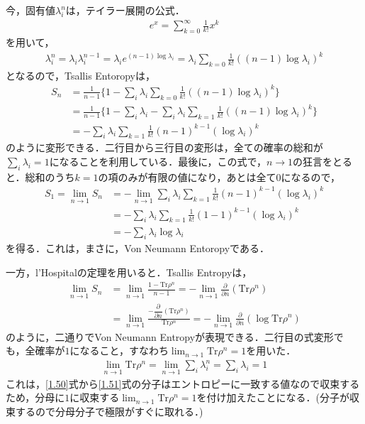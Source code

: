 今，固有値$\lambda_{i}^{n}$は，テイラー展開の公式．
\begin{align}
  e^{x}=\sum_{k=0}^{\infty}\frac{1}{k!}x^{k}
\end{align}
を用いて，
\begin{align}
  \lambda_{i}^{n}=\lambda_{i}\lambda_{i}^{n-1}=\lambda_{i}e^{(n-1)\log \lambda_{i}}=\lambda_{i}\sum_{k=0}\frac{1}{k!}((n-1)\log \lambda_{i})^{k}
\end{align}
となるので，Tsallis Entoropyは，
\begin{align}
S_{n}&=\frac{1}{n-1}\biggl\{1-\sum_{i}\lambda_{i}\sum_{k=0}\frac{1}{k!}((n-1)\log \lambda_{i})^{k}\biggr\}\\
&=\frac{1}{n-1}\biggl\{1-\sum_{i}\lambda_{i}-\sum_{i}\lambda_{i}\sum_{k=1}\frac{1}{k!}((n-1)\log \lambda_{i})^{k}\biggr\}\\
&=-\sum_{i}\lambda_{i}\sum_{k=1}\frac{1}{k!}(n-1)^{k-1}(\log \lambda_{i})^{k}
\end{align}
のように変形できる．二行目から三行目の変形は，全ての確率の総和が$\sum_{i}\lambda_{i}=1$になることを利用している．最後に，この式で，$n \to 1$の狂言をとると．総和のうち$k=1$の項のみが有限の値になり，あとは全て0になるので，
\begin{align}
  S_{1}=\lim_{n \to 1}S_{n}&=-\lim_{n \to 1}\sum_{i}\lambda_{i}\sum_{k=1}\frac{1}{k!}(n-1)^{k-1}(\log \lambda_{i})^{k}\\
  &=-\sum_{i}\lambda_{i}\sum_{k=1}\frac{1}{k!}(1-1)^{k-1}(\log \lambda_{i})^{k}\\
  &=-\sum_{i}\lambda_{i}\log \lambda_{i}
\end{align}
を得る．これは，まさに，Von Neumann Entoropyである．

一方，l'Hospitalの定理を用いると．Tsallis Entropyは，
\begin{align}
  \label{1.50}
  \lim_{n \to 1}S_{n}&=\lim_{n \to 1}\frac{1-\mathrm{Tr}\rho^n}{n-1}
  =-\lim_{n \to 1}\frac{\partial}{\partial n}(\mathrm{Tr}\rho^n)\\
  &=\lim_{n \to 1}\frac{-\dfrac{\partial}{\partial n}(\mathrm{Tr}\rho^n)}{\mathrm{Tr}\rho^{n}}
  \label{1.51}
  =-\lim_{n \to 1}\frac{\partial}{\partial n}(\log\mathrm{Tr}\rho^{n})
\end{align}
のように，二通りでVon Neumann Entropyが表現できる．二行目の式変形でも，全確率が$1$になること，すなわち$\lim_{n \to 1}\mathrm{Tr}\rho^n=1$を用いた．
\begin{align}
  \lim_{n \to 1}\mathrm{Tr}\rho^n=\lim_{n \to 1}\sum_{i}\lambda_{i}^n=\sum_{i}\lambda_{i}=1
\end{align}
これは，\ref{1.50}式から\ref{1.51}式の分子はエントロピーに一致する値なので収束するため，分母に$1$に収束する$\lim_{n \to 1}\mathrm{Tr}\rho^n=1$を付け加えたことになる．(分子が収束するので分母分子で極限がすぐに取れる．)

